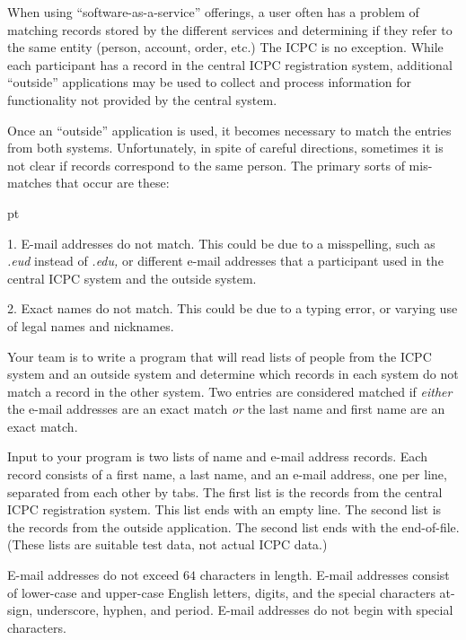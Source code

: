 
\def\headeryear{2020/2021}
\def\probname{ICPC Record Matching}
\def\probno{1}
\fullheader
\par
When using ``software-as-a-service'' offerings, a user often has a
problem of matching records stored by the different services and
determining if they refer to the same entity (person, account,
order, etc.)  The ICPC is no exception.  While each participant has a
record in the central ICPC registration system, additional ``outside''
applications may be used to collect and process information for
functionality not provided by the central system.
\par
Once an ``outside'' application is used, it becomes necessary to match
the entries from both systems.  Unfortunately, in spite of careful
directions, sometimes it is not clear if records correspond to the
same person.  The primary sorts of mis-matches that occur are these:
{ pt
\item {1.}  E-mail addresses do not match.  This could be due to a misspelling,
such as {\sl .eud} instead of {\sl .edu,} or different e-mail addresses
that a participant used in the central ICPC system and the outside system.
\item {2.}  Exact names do not match.  This could be due to a typing error, or
varying use of legal names and nicknames.
\par}
\par
Your team is to write a program that will read lists of people from
the ICPC system and an outside system and determine which records in
each system do not match a record in the other system.  Two entries
are considered matched if {\sl either} the e-mail addresses are an exact
match {\sl or} the last name and first name are an exact match.
\par
Input to your program is two lists of name and e-mail address
records.  Each record consists of a first name, a last name, and an
e-mail address, one per line, separated from each other by tabs.  The
first list is the records from the central ICPC registration system.
This list ends with an empty line.  The second list is the records
from the outside application.  The second list ends with the end-of-file.
(These lists are suitable test data, not actual ICPC data.)
\par
E-mail addresses do not exceed $64$ characters in length.
E-mail addresses consist of lower-case and upper-case English letters,
digits, and the special characters at-sign, underscore, hyphen, and
period.  E-mail addresses do not begin with special characters.
